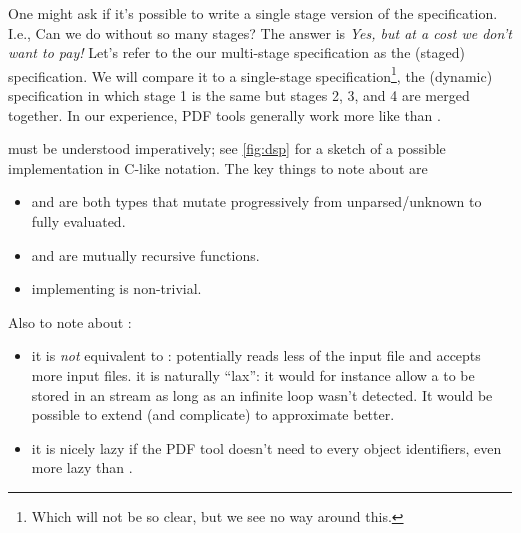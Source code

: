 One might ask if it's possible to write a single stage version of the
specification.  I.e., Can we do without so many stages?
The answer is \emph{Yes, but at a cost we don't want to pay!}
Let's refer to the our multi-stage specification as the \ssp{}
(staged) specification.
%
We will compare it to a single-stage specification\footnote{
  Which will not be so clear, but we see no way around this.
}, the \dsp{}
(dynamic) specification in which stage 1 is the same
but stages 2, 3, and 4 are
merged together.
%
In our experience, PDF tools generally work more like \dsp{} than \ssp{}.

\dsp must be understood imperatively; see \cref{fig:dsp} for a sketch
of a possible implementation in C-like notation.
The key things to note about \dsp{} are
\begin{itemize}
\item {} and  are both types that mutate progressively
   from unparsed/unknown to fully evaluated.
\item {} and  are mutually recursive functions.
\item implementing  is non-trivial.
\end{itemize}
Also to note about \dsp{}:
\begin{itemize}
\item it is \emph{not} equivalent to \ssp{}: \dsp{} potentially reads
  less of the input file and accepts more input files.  it is
  naturally ``lax'': it would for instance allow a  to
  be stored in an  stream as long as an infinite loop
  wasn't detected.  It would be possible to extend (and complicate) \dsp{}
  to approximate \ssp{} better.
\item it is nicely lazy if the PDF tool doesn't need to 
  every object identifiers, even more lazy than \ssp{}.
\end{itemize}

